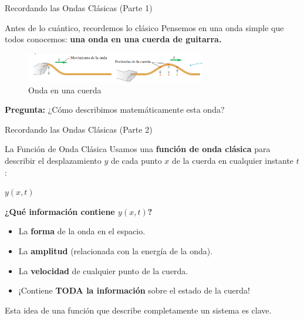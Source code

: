 \documentclass[12pt,aspectratio=169]{beamer}
\begin{document}
	\begin{frame}{Recordando las Ondas Clásicas (Parte 1)}
		\begin{block}{Antes de lo cuántico, recordemos lo clásico}
			Pensemos en una onda simple que todos conocemos: \textbf{una onda en una cuerda de guitarra.}
		\end{block}
	\begin{figure}
		\centering
		\includegraphics[width=0.7\textwidth]{../Imagenes/cuerda} 
		\caption{Onda en una cuerda}
	\end{figure}
	\textbf{Pregunta:} ¿Cómo describimos matemáticamente esta onda?
\end{frame}

	\begin{frame}{Recordando las Ondas Clásicas (Parte 2)}
		\begin{block}{La Función de Onda Clásica}
			Usamos una \textbf{función de onda clásica} para describir el desplazamiento $y$ de cada punto $x$ de la cuerda en cualquier instante $t$:
			\begin{center}
				\Large $y(x, t)$
			\end{center}
			\vspace{1em}
			\textbf{¿Qué información contiene $y(x, t)$?}
		\begin{itemize}
			\item La \textbf{forma} de la onda en el espacio.
			\item La \textbf{amplitud} (relacionada con la energía de la onda).
			\item La \textbf{velocidad} de cualquier punto de la cuerda.
			\item ¡Contiene \textbf{TODA la información} sobre el estado de la cuerda!
		\end{itemize}
	\end{block}
	Esta idea de una función que describe completamente un sistema es clave.
	\end{frame}
	
\end{document}
